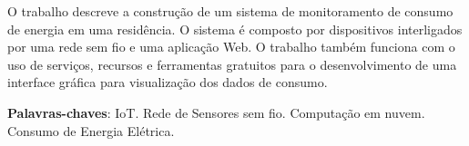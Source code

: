 \setlength{\absparsep}{18pt} %
\begin{resumo}

 O trabalho descreve a construção de um sistema de monitoramento de consumo de energia em uma residência. O sistema é composto por dispositivos interligados por uma rede sem fio e uma aplicação Web. O trabalho também funciona com o uso de serviços, recursos e ferramentas gratuitos para o desenvolvimento de uma interface gráfica para visualização dos dados de consumo.

 \textbf{Palavras-chaves}: IoT. Rede de Sensores sem fio. Computação em nuvem. Consumo de Energia Elétrica.
\end{resumo}
